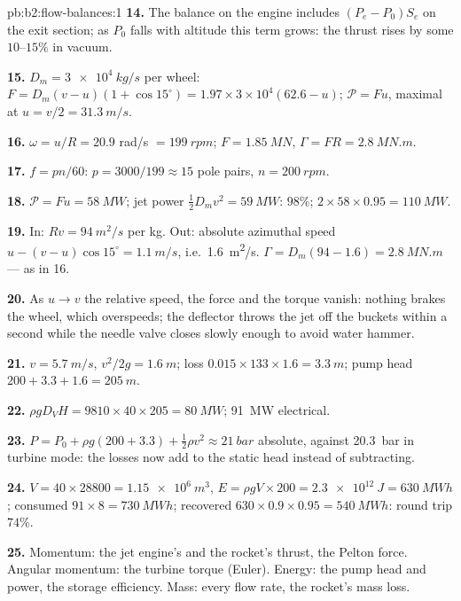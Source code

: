 \begin{solution}{pb:b2:flow-balances:1}
\textbf{14.} The balance on the engine includes $(P_e - P_0)S_e$ on the
exit section; as $P_0$ falls with altitude this term grows: the thrust
rises by some $10$--$15\%$ in vacuum.

\textbf{15.} $D_m = \qty{3e4}{kg/s}$ per wheel: $F = D_m(v - u)(1 + \cos15^\circ) =
1.97 \times 3 \times 10^4(62.6 - u)$; $\mathcal P = Fu$, maximal at $u = v/2 = \qty{31.3}{m/s}$.

\textbf{16.} $\omega = u/R = 20.9$ rad/s $= \qty{199}{rpm}$; $F = \qty{1.85}{MN}$, $\Gamma = FR
= \qty{2.8}{MN.m}$.

\textbf{17.} $f = pn/60$: $p = 3000/199 \approx 15$ pole pairs, $n = \qty{200}{rpm}$.

\textbf{18.} $\mathcal P = Fu = \qty{58}{MW}$; jet power $\tfrac12D_mv^2 = \qty{59}{MW}$:
$98\%$; $2 \times 58 \times 0.95 = \qty{110}{MW}$.

\textbf{19.} In: $Rv = \qty{94}{m^2/s}$ per kg. Out: absolute azimuthal speed
$u - (v - u)\cos15^\circ = \qty{1.1}{m/s}$, i.e.\ \qty{1.6}{m^2/s}. $\Gamma = D_m(94 -
1.6) = \qty{2.8}{MN.m}$ --- as in 16.

\textbf{20.} As $u \to v$ the relative speed, the force and the torque
vanish: nothing brakes the wheel, which overspeeds; the deflector
throws the jet off the buckets within a second while the needle valve
closes slowly enough to avoid water hammer.

\textbf{21.} $v = \qty{5.7}{m/s}$, $v^2/2g = \qty{1.6}{m}$; loss $0.015 \times 133 \times 1.6 =
\qty{3.3}{m}$; pump head $200 + 3.3 + 1.6 = \qty{205}{m}$.

\textbf{22.} $\rho gD_VH = 9810 \times 40 \times 205 = \qty{80}{MW}$; \qty{91}{MW} electrical.

\textbf{23.} $P = P_0 + \rho g(200 + 3.3) + \tfrac12\rho v^2 \approx \qty{21}{bar}$ absolute,
against \qty{20.3}{bar} in turbine mode: the losses now add to the
static head instead of subtracting.

\textbf{24.} $V = 40 \times 28800 = \qty{1.15e6}{m^3}$, $E = \rho gV \times 200 = \qty{2.3e12}{J}
= \qty{630}{MWh}$; consumed $91 \times 8 = \qty{730}{MWh}$; recovered $630 \times 0.9 \times
0.95 = \qty{540}{MWh}$: round trip $74\%$.

\textbf{25.} Momentum: the jet engine's and the rocket's thrust, the
Pelton force. Angular momentum: the turbine torque (Euler). Energy: the
pump head and power, the storage efficiency. Mass: every flow rate,
the rocket's mass loss.
\end{solution}
